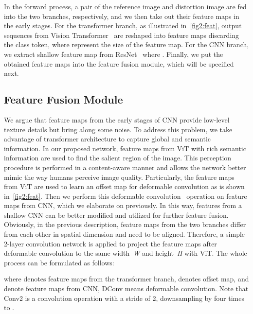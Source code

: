 \documentclass[10pt,twocolumn,letterpaper]{article}
\begin{document}
In the forward process, a pair of the reference image and distortion image are fed into the two branches, respectively, and we then take out their feature maps in the early stages. For the transformer branch, as illustrated in~\cref{fig2:feat}, output sequences from Vision Transformer~\cite{dosovitskiy2020image} are reshaped into feature maps  discarding the class token, where  represent the size of the feature map. For the CNN branch, we extract shallow feature map from ResNet~\cite{he2016deep}  where . Finally, we put the obtained feature maps into the feature fusion module, which will be specified next.
 

\subsection{Feature Fusion Module}
\label{subsec:fusion}
We argue that feature maps from the early stages of CNN provide low-level texture details but bring along some noise. To address this problem, we take advantage of transformer architecture to capture global and semantic information. In our proposed network, feature maps from ViT with rich semantic information are used to find the salient region of the image. This perception procedure is performed in a content-aware manner and allows the network better mimic the way humans perceive image quality. Particularly, the feature maps from ViT are used to learn an offset map for deformable convolution as is shown in~\cref{fig2:feat}. Then we perform this deformable convolution~\cite{dai2017deformable} operation on feature maps from CNN, which we elaborate on previously. In this way, features from a shallow CNN can be better modified and utilized for further feature fusion. Obviously, in the previous description, feature maps from the two branches differ from each other in spatial dimension and need to be aligned. Therefore, a simple 2-layer convolution network is applied to project the feature maps after deformable convolution to the same width~\textit{W} and height~\textit{H} with ViT. The whole process can be formulated as follows:

where  denotes feature maps from the transformer branch,  denotes offset map,  and  denote feature maps from CNN, DConv means deformable convolution. Note that Conv2 is a convolution operation with a stride of 2, downsampling  by four times to . 
\end{document}
